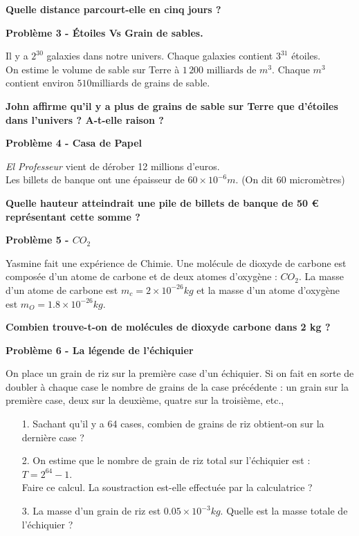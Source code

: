 \textbf{Quelle distance parcourt-elle en cinq jours ?}

\Pointilles[4]

\newpage

\textbf{Problème 3 - Étoiles Vs Grain de sables.}

Il y a $2^{30}$ galaxies dans notre univers. Chaque galaxies contient $3^{31}$ étoiles.  \\
On estime le volume de sable sur Terre à $1\,200 \text{ milliards de } m^3$. Chaque $m^3$ contient environ $510 \text{milliards}$ de grains de sable. 

\textbf{John affirme qu'il y a plus de grains de sable sur Terre que d'étoiles dans l'univers ? A-t-elle raison ?}

\Pointilles[5]

\textbf{Problème 4 - Casa de Papel}

\textit{\og El Professeur \fg{} } vient de dérober 12 millions d’euros. \\
Les billets de banque ont une épaisseur de $60 \times 10^{-6} m$. (On dit 60 micromètres)

\textbf{Quelle hauteur atteindrait une pile de billets de banque de 50 \euro{} représentant cette somme ?}

\Pointilles[6]

\textbf{Problème 5 - $CO_2$}

Yasmine fait une expérience de Chimie. Une molécule de dioxyde de carbone est composée d'un atome de carbone et de deux atomes d'oxygène : $CO_2$. La masse d'un atome de carbone est $ m_c = 2 \times 10^{-26}kg$ et la masse d'un atome d'oxygène est $ m_O = 1.8 \times 10^{-26}kg$. 

\textbf{Combien trouve-t-on de molécules de dioxyde carbone dans 2 kg ?}

\Pointilles[6]

\textbf{Problème 6 - La légende de l'échiquier}

\og On place un grain de riz sur la première case d'un échiquier. Si on fait en sorte de doubler à chaque case le nombre de grains de la case précédente : un grain sur la première case, deux sur la deuxième, quatre sur la troisième, etc.,

\begin{itemize}
    \item[1.] Sachant qu'il y a 64 cases, combien de grains de riz obtient-on sur la dernière case ? 
    \item[2.] On estime que le nombre de grain de riz total sur l'échiquier est : $T = 2^{64} - 1$. \\
    Faire ce calcul. La soustraction est-elle effectuée par la calculatrice ?
    \item[3.] La masse d'un grain de riz est $0.05 \times 10^{-3} kg$. Quelle est la masse totale de l'échiquier ? 
\end{itemize}

\Pointilles[10]


